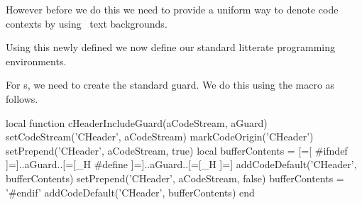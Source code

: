 However before we do this we need to provide a uniform way to denote code 
contexts by using \ConTeXt\ text backgrounds. 

\startMkIVCode
{}
\setuptextbackground%
  [LitProgFrame]%
  [location=paragraph, background=color, backgroundcolor=gray]
\stopMkIVCode

Using this newly defined  we now define our standard 
litterate programming environments. 

\startMkIVCode
{}

  





\setLitProgsOriginMarker[MkIVCode][markMkIVCodeOrigin]
\setLitProgsOriginMarker[MpIVCode][markMpIVCodeOrigin]
\setLitProgsOriginMarker[LuaCode][markLuaCodeOrigin]
\setLitProgsOriginMarker[LuaTemplate][markLuaTemplateOrigin]
\setLitProgsOriginMarker[CHeader][markCHeaderOrigin]
\setLitProgsOriginMarker[CCode][markCCodeOrigin]
\stopMkIVCode

For s, we need to create the standard  guard. 
We do this using the \type{\CHeaderIncludeGuard} macro as follows. 

\startMkIVCode
\def\CHeaderIncludeGuard#1#2{
  \directlua{
    thirddata.literateProgs.cHeaderIncludeGuard('#1', '#2')
  }
}
\stopMkIVCode

\startLuaCode
local function cHeaderIncludeGuard(aCodeStream, aGuard)
  setCodeStream('CHeader', aCodeStream)
  markCodeOrigin('CHeader')
  setPrepend('CHeader', aCodeStream, true)
  local bufferContents = [=[
#ifndef ]=]..aGuard..[=[_H
#define ]=]..aGuard..[=[_H
]=]
  addCodeDefault('CHeader', bufferContents)
  setPrepend('CHeader', aCodeStream, false)
  bufferContents = '#endif'
  addCodeDefault('CHeader', bufferContents)
end

